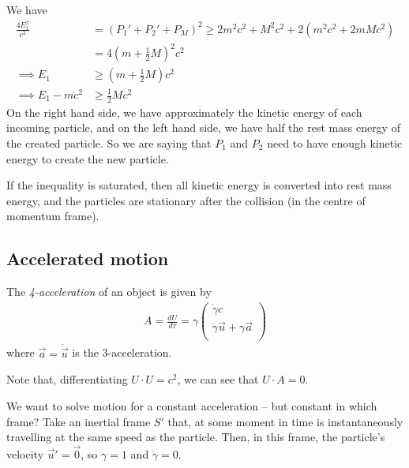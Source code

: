 \documentclass{../template/note}
\begin{document}
    We have
    \begin{align*}
        \frac{4E_1^2}{c^2} &= (P_1'+P_2'+P_M)^2 \geq 2m^2c^2 + M^2c^2 + 2(m^2c^2 + 2mMc^2) \\
        &= 4\left(m + \frac 1 2 M\right)^2c^2 \\
        \implies E_1 &\geq \left(m + \frac 1 2 M\right)c^2 \\
        \implies E_1 - mc^2 &\geq \frac 1 2 Mc^2
    \end{align*}
    On the right hand side, we have approximately the kinetic energy of each incoming particle, and on the left hand side, we have half the rest mass energy of the created particle. So we are saying that $P_1$ and $P_2$ need to have enough kinetic energy to create the new particle.
    
    If the inequality is saturated, then all kinetic energy is converted into rest mass energy, and the particles are stationary after the collision (in the centre of momentum frame).

    \subsection{Accelerated motion}

    \begin{definition}[4-acceleration]
        The \emph{4-acceleration} of an object is given by
        \begin{align*}
            A = \frac{dU}{d\tau} = \gamma \begin{pmatrix}
                \dot \gamma c \\
                \dot \gamma \vec u + \gamma \vec a \\
            \end{pmatrix}
        \end{align*}
        where $\vec a = \dot{\vec u}$ is the 3-acceleration.
    \end{definition}

    \begin{remark*}
        Note that, differentiating $U \cdot U = c^2$, we can see that $U \cdot A = 0$.
    \end{remark*}

    We want to solve motion for a constant acceleration -- but constant in which frame? Take an inertial frame $S'$ that, at some moment in time is instantaneously travelling at the same speed as the particle. Then, in this frame, the particle's velocity $\vec u' = \vec 0$, so $\gamma = 1$ and $\dot \gamma = 0$.
\end{document}

